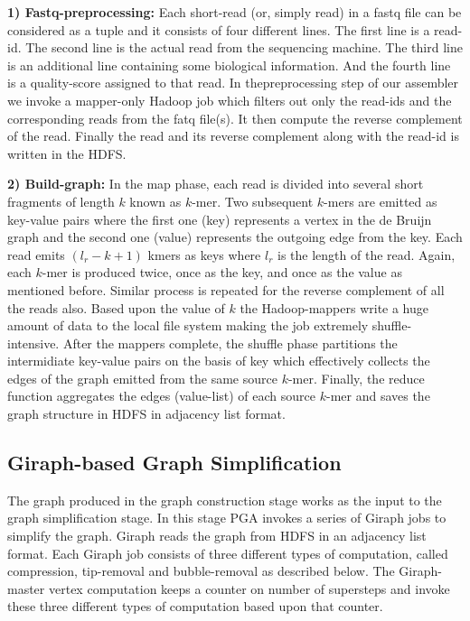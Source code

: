 \documentclass[conference]{IEEEtran}
\begin{document}
\textbf{1) Fastq-preprocessing:} Each short-read (or, simply read) in a fastq file can be considered as a tuple and it consists of four different lines. The first line is a read-id. The second line is the actual read from the sequencing machine. The third line is an additional line containing some biological information. And the fourth line is a quality-score assigned to that read. 
In thepreprocessing step of our assembler we invoke a mapper-only Hadoop job which filters out only the read-ids and the corresponding reads from the fatq file(s). It then compute the reverse complement of the read. Finally the read and its reverse complement along with the read-id is written in the HDFS.

\textbf{2) Build-graph:} 
In the map phase, each read is divided into several short fragments of length $k$ known as $k$-mer.
Two subsequent $k$-mers are emitted as key-value pairs where the first one (key) represents a vertex in the de Bruijn graph and the second one (value) represents the outgoing edge from the key. 
Each read emits $(l_r-k+1)$ kmers as keys where $l_r$ is the length of the read.
Again, each $k$-mer is produced twice, once as the key, and once as the value as mentioned before.
Similar process is repeated for the reverse complement of all the reads also.
Based upon the value of $k$ the Hadoop-mappers write a huge amount of data to the local file system making the job extremely shuffle-intensive. 
After the mappers complete, the shuffle phase partitions the intermidiate key-value pairs on the basis of key which effectively collects the edges of the graph emitted from the same source $k$-mer.
Finally, the reduce function aggregates the edges (value-list) of each source $k$-mer and saves the graph structure in HDFS in adjacency list format.

\subsection {Giraph-based Graph Simplification}
The graph produced in the graph construction stage works as the input to the graph simplification stage.
In this stage PGA invokes a series of Giraph jobs to simplify the graph.
Giraph reads the graph from HDFS in an adjacency list format.
Each Giraph job consists of three different types of computation, called compression, tip-removal and bubble-removal as described below.
The Giraph-master vertex computation keeps a counter on number of supersteps and invoke these three different types of computation based upon that counter.
 
\end{document}
